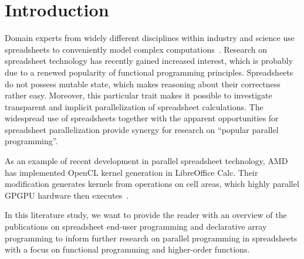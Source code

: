 \documentclass[a4paper]{article}
\begin{document}




\makefront

\author{Florian Biermann\\\small{\texttt{fbie@itu.dk}}}

\maketitle

\section{Introduction}
\label{sec:intro}

Domain experts from widely different disciplines within industry and science use spreadsheets to conveniently model complex computations~\cite{Sestoft2014Spreadsheet}. Research on spreadsheet technology has recently gained increased interest, which is probably due to a renewed popularity of functional programming principles. Spreadsheets do not possess mutable state, which makes reasoning about their correctness rather easy. Moreover, this particular trait makes it possible to investigate transparent and implicit parallelization of spreadsheet calculations. The widespread use of spreadsheets together with the apparent opportunities for spreadsheet parallelization provide synergy for research on ``popular parallel programming''.

As an example of recent development in parallel spreadsheet technology, AMD has implemented OpenCL kernel generation in LibreOffice Calc. Their modification generates kernels from operations on cell areas, which highly parallel GPGPU hardware then executes~\cite{Trudeau2015Collaboration}.

In this literature study, we want to provide the reader with an overview of the publications on spreadsheet end-user programming and declarative array programming to inform further research on parallel programming in spreadsheets with a focus on functional programming and higher-order functions.
\end{document}
